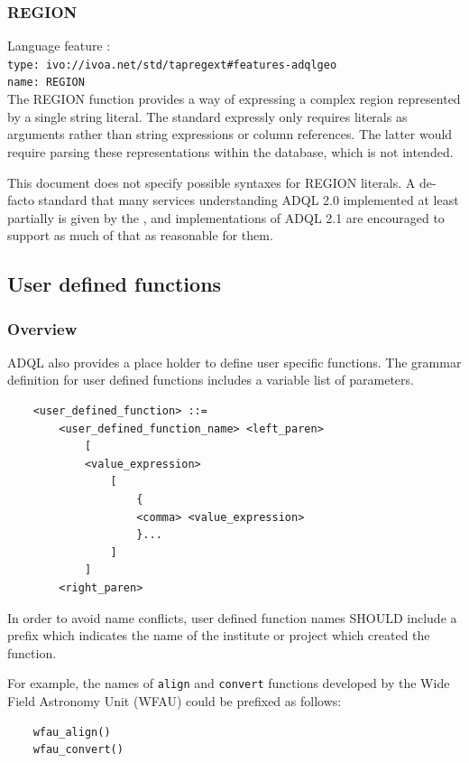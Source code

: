\documentclass[11pt,a4paper]{ivoa}
\begin{document}
\subsubsection{REGION}
\label{sec:functions.geom.region}

{\footnotesize Language feature :}\\
{\footnotesize \verb|type: ivo://ivoa.net/std/tapregext#features-adqlgeo|}\\
{\footnotesize \verb|name: REGION|}\\


The REGION function provides a way of expressing a complex region
represented by a single string literal.  The standard expressly only
requires literals as arguments rather than string expressions or column
references.  The latter would require parsing these representations
within the database, which is not intended.

This document does not specify possible syntaxes for REGION literals. A de-facto
standard that many services understanding ADQL 2.0 implemented at least
partially is given by the \STCSAppendix{}, and implementations of ADQL 2.1 are
encouraged to support as much of that as reasonable for them.

\subsection{User defined functions}
\label{sec:user.functions}
\subsubsection{Overview}

ADQL also provides a place holder to define user specific functions. The grammar
definition for user defined functions includes a variable list of parameters.

\begin{verbatim}
    <user_defined_function> ::=
        <user_defined_function_name> <left_paren>
            [
            <value_expression>
                [
                    {
                    <comma> <value_expression>
                    }...
                ]
            ]
        <right_paren>
\end{verbatim}

In order to avoid name conflicts, user defined function names SHOULD include
a prefix which indicates the name of the institute or project which created
the function.

For example, the names of \verb:align: and \verb:convert: functions developed
by the Wide Field Astronomy Unit (WFAU) could be prefixed as follows:
\begin{verbatim}
    wfau_align()
    wfau_convert()
\end{verbatim}
\end{document}
